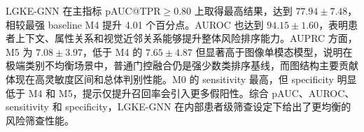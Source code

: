 \documentclass[UTF8,a4paper,10pt,twocolumn,fontset=fandol]{ctexart}
\renewcommand{\arraystretch}{1.12}
\newcommand{\modelname}{LGKE-GNN}
\begin{document}







\modelname{} 在主指标 pAUC@TPR$\geq0.80$ 上取得最高结果，达到 $77.94\pm7.48$，相较最强 baseline M4 提升 4.01 个百分点。AUROC 也达到 $94.15\pm1.60$，表明患者上下文、属性关系和视觉近邻关系能够提升整体风险排序能力。AUPRC 方面，M5 为 $7.08\pm3.97$，低于 M4 的 $7.65\pm4.87$ 但显著高于图像单模态模型，说明在极端类别不均衡场景中，普通门控融合仍是强少数类排序基线，而图结构主要贡献体现在高灵敏度区间和总体判别性能。M0 的 sensitivity 最高，但 specificity 明显低于 M4 和 M5，提示仅提升召回率会引入更多假阳性。综合 pAUC、AUROC、sensitivity 和 specificity，\modelname{} 在内部患者级筛查设定下给出了更均衡的风险筛查性能。
\end{document}
